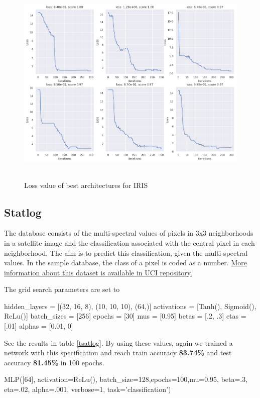 \documentclass[10pt]{SelfArx} %
\begin{document}
	\begin{figure}\centering
		\includegraphics[width=1.79\columnwidth, height=10cm]{img/iris-plots1}
		\caption{Loss value of best architectures for IRIS}
		\label{firis}
	\end{figure}
	
	\subsection{Statlog}
	The database consists of the multi-spectral values of pixels in 3x3 neighborhoods in a satellite image and the classification associated with the central pixel in each neighborhood. The aim is to predict this classification, given the multi-spectral values. In the sample database, the class of a pixel is coded as a number. \href{https://archive.ics.uci.edu/ml/datasets/Statlog+(Landsat+Satellite)}{More information about this dataset is available in UCI repository.}
	
	The grid search parameters are set to
	
	\begin{python}
hidden_layers = [(32, 16, 8),
(10, 10, 10), (64,)]
activations = [Tanh(), Sigmoid(),
ReLu()]
batch_sizes = [256]
epochs = [30]
mus = [0.95]
betas = [.2, .3]
etas = [.01]
alphas = [0.01, 0]
\end{python}
	See the results in table \ref{tsatlog}. By using these values, again we trained a network with this specification and reach train accuracy \textbf{83.74\%} and test accuracy \textbf{81.45\%} in 100 epochs.
	
	\begin{python}
MLP([64], activation=ReLu(), 
batch_size=128,epochs=100,mu=0.95,
beta=.3, eta=.02, alpha=.001,
verbose=1, task='classification')
	\end{python}
	
\end{document}

